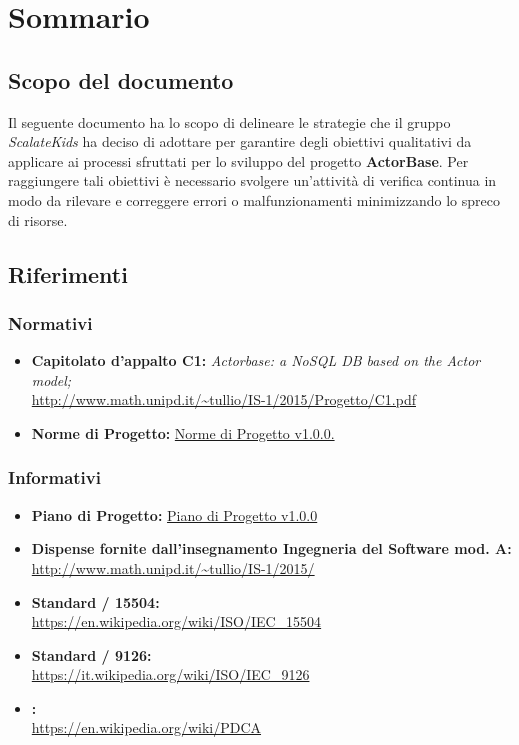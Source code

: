 \documentclass{scalatekids-article}
\begin{document}
\section{Sommario}
\subsection{Scopo del documento}
Il seguente documento ha lo scopo di delineare le strategie che il gruppo \textit{ScalateKids} ha deciso di adottare per garantire degli obiettivi qualitativi da applicare ai processi sfruttati per lo sviluppo del progetto \textbf{ActorBase}. Per raggiungere tali obiettivi è necessario svolgere un'attività di verifica continua in modo da rilevare e correggere errori o malfunzionamenti minimizzando lo spreco di risorse.
\prodPurpose
\glossExpl
\subsection{Riferimenti}
\subsubsection{Normativi}
\begin{itemize}
\item\textbf{Capitolato d'appalto C1:} \textit{Actorbase: a NoSQL DB based on the Actor model;}\\
  \url{http://www.math.unipd.it/~tullio/IS-1/2015/Progetto/C1.pdf}
\item\textbf{Norme di Progetto:} \href{run:../Interni/NormeDiProgetto\_v1.0.0.pdf}{Norme di Progetto v1.0.0.}
\end{itemize}
\subsubsection{Informativi}
\begin{itemize}
\item\textbf{Piano di Progetto:} \href{run:./PianoDiProgetto\_v1.0.0.pdf}{Piano di Progetto v1.0.0}
\item\textbf{Dispense fornite dall'insegnamento Ingegneria del Software mod. A:}\\
  \url{http://www.math.unipd.it/~tullio/IS-1/2015/}
\item\textbf{Standard / 15504:}\\
\url{https://en.wikipedia.org/wiki/ISO/IEC_15504}
\item\textbf{Standard / 9126:}\\
\url{https://it.wikipedia.org/wiki/ISO/IEC_9126}
\item\textbf{:}\\
\url{https://en.wikipedia.org/wiki/PDCA}
\end{itemize}
\newpage
\end{document}
